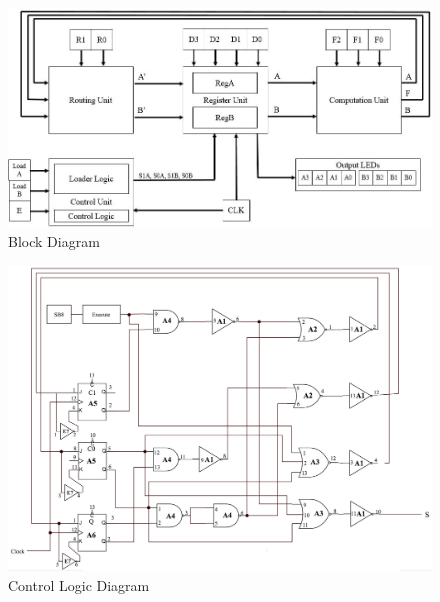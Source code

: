 \documentclass[journal, twocolumn, final,11pt,letterpaper]{IEEEtran}
\begin{document}
\begin{figure} [htbp]
	\centering
	\includegraphics[scale=0.55]{images/BlockDiagram.jpg}
	\caption{Block Diagram\label{fig:block-diagram}}
\end{figure}

\begin{figure} [htbp]
	\centering
	\includegraphics[scale=0.55]{Control_Logic.png}
	\caption{Control Logic Diagram\label{fig:control-logic-diagram}}
\end{figure}
\end{document}
